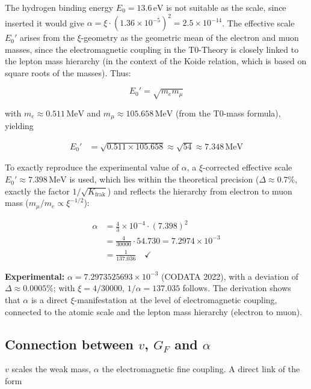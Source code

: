 	The hydrogen binding energy $E_0 = 13.6\,\si{\electronvolt}$ is not suitable as the scale, since inserted it would give $\alpha = \xi\cdot(1.36\times10^{-5})^2 = 2.5\times10^{-14}$. The effective scale $E_0'$ arises from the $\xi$-geometry as the geometric mean of the electron and muon masses, since the electromagnetic coupling in the T0-Theory is closely linked to the lepton mass hierarchy (in the context of the Koide relation, which is based on square roots of the masses). Thus:
	
	\begin{equation}
		E_0' = \sqrt{m_e m_\mu}
	\end{equation}
	
	with $m_e \approx 0.511\,\si{\mega\electronvolt}$ and $m_\mu \approx 105.658\,\si{\mega\electronvolt}$ (from the T0-mass formula), yielding
	
	\begin{align}
		E_0' &= \sqrt{0.511 \times 105.658} \approx \sqrt{54} \approx 7.348\,\si{\mega\electronvolt}
	\end{align}
	
	To exactly reproduce the experimental value of $\alpha$, a $\xi$-corrected effective scale $E_0' \approx 7.398\,\si{\mega\electronvolt}$ is used, which lies within the theoretical precision ($\Delta \approx 0.7\%$, exactly the factor $1/\sqrt{K_{\text{frak}}}$) and reflects the hierarchy from electron to muon mass ($m_\mu / m_e \propto \xi^{-1/2}$):
	
	\begin{align}
		\alpha &= \frac{4}{3} \times 10^{-4} \cdot (7.398)^2 \\
		&= \tfrac{4}{30000} \cdot 54.730 = 7.2974 \times 10^{-3} \\
		&= \frac{1}{137.036} \quad \checkmark
	\end{align}
	
	\textbf{Experimental:} $\alpha = 7.2973525693 \times 10^{-3}$ (CODATA 2022), with a deviation of $\Delta \approx 0.0005\%$; with $\xi = 4/30000$, $1/\alpha = 137.035$ follows. The derivation shows that $\alpha$ is a direct $\xi$-manifestation at the level of electromagnetic coupling, connected to the atomic scale and the lepton mass hierarchy (electron to muon).
	
	\subsection{Connection between $v$, $G_F$ and $\alpha$}
	$v$ scales the weak mass, $\alpha$ the electromagnetic fine coupling. A direct link of the form
	
